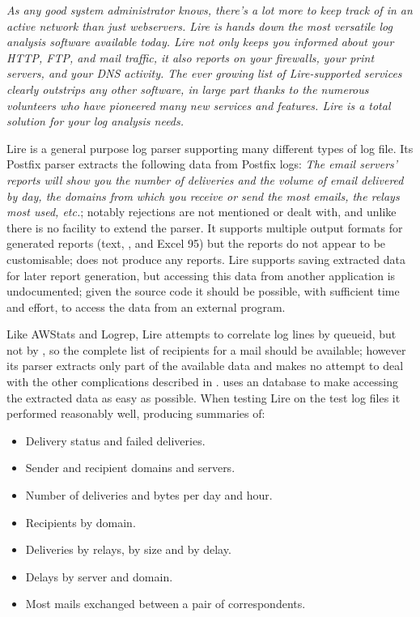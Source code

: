 \textit{As any good system administrator knows, there's a lot more to keep
track of in an active network than just webservers. Lire is hands down the
most versatile log analysis software available today. Lire not only keeps
you informed about your HTTP, FTP, and mail traffic, it also reports on
your firewalls, your print servers, and your DNS activity. The ever growing
list of Lire-supported services clearly outstrips any other software, in
large part thanks to the numerous volunteers who have pioneered many new
services and features. Lire is a total solution for your log analysis
needs.\/}

Lire is a general purpose log parser supporting many different types of log
file.  Its Postfix parser extracts the following data from Postfix logs:
\textit{The email servers' reports will show you the number of deliveries
and the volume of email delivered by day, the domains from which you
receive or send the most emails, the relays most used, etc.\/}; notably
rejections are not mentioned or dealt with, and unlike \parsername{} there
is no facility to extend the parser.  It supports multiple output formats
for generated reports (text, \HTML{}, \PDF{} and Excel 95) but the reports
do not appear to be customisable; \parsername{} does not produce any
reports.  Lire supports saving extracted data for later report generation,
but accessing this data from another application is undocumented; given the
source code it should be possible, with sufficient time and effort, to
access the data from an external program.

Like AWStats and Logrep, Lire attempts to correlate log lines by queueid,
but not by \pid{}, so the complete list of recipients for a mail should be
available; however its parser extracts only part of the available data and
makes no attempt to deal with the other complications described in
 .
\parsername{} uses an \SQL{} database to make accessing the extracted data
as easy as possible.  When testing Lire on the \numberOFlogFILES{} test log
files it performed reasonably well, producing summaries of: 

\begin{itemize}

    \item Delivery status and failed deliveries.

    \item Sender and recipient domains and servers.

    \item Number of deliveries and bytes per day and hour.

    \item Recipients by domain.

    \item Deliveries by relays, by size and by delay.

    \item Delays by server and domain.

    \item Most mails exchanged between a pair of correspondents.

\end{itemize}

